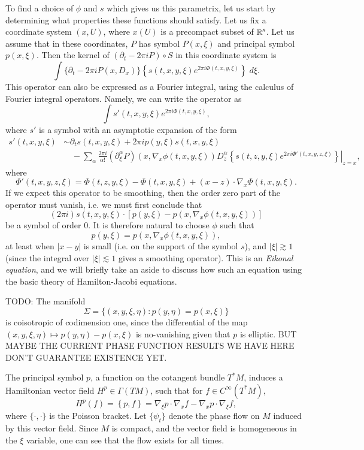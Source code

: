 To find a choice of $\phi$ and $s$ which gives us this parametrix, let us start by determining what properties these functions should satisfy. Let us fix a coordinate system $(x,U)$, where $x(U)$ is a precompact subset of $\operatorname{\mathbb{R}}^n$. Let us assume that in these coordinates, $P$ has symbol $P(x,\xi)$ and principal symbol $p(x,\xi)$. Then the kernel of $(\partial_t - 2 \pi i P) \circ S$ in this coordinate system is
%
\[ \int \{ \partial_t - 2 \pi i P(x,D_x) \} \left\{ s(t,x,y,\xi) e^{2 \pi i \Phi(t,x,y,\xi)} \right\}\; d\xi. \]
%
This operator can also be expressed as a Fourier integral, using the calculus of Fourier integral operators. Namely, we can write the operator as
%
\[ \int s'(t,x,y,\xi) e^{2 \pi i \Phi(t,x,y,\xi)}, \]
%
where $s'$ is a symbol with an asymptotic expansion of the form
%
\begin{align*}
    s'(t,x,y,\xi) &\sim \partial_t s(t,x,y,\xi) + 2 \pi i p(y,\xi) s(t,x,y,\xi)\\
    &\quad - \sum_\alpha \frac{2 \pi i}{\alpha!} (\partial_\xi^\alpha P)(x, \nabla_x \phi(t,x,y,\xi)) \left. D^\alpha_z \left\{ s(t,z,y,\xi) e^{2 \pi i \Phi'(t,x,y,z,\xi)} \right\} \right|_{z = x},
\end{align*}
%
where
%
\[ \Phi'(t,x,y,z,\xi) = \Phi(t,z,y,\xi) - \Phi(t,x,y,\xi) + (x - z) \cdot \nabla_x \Phi(t,x,y,\xi). \]
%
If we expect this operator to be smoothing, then the order zero part of the operator must vanish, i.e. we must first conclude that
%
\[ (2 \pi i) s(t,x,y,\xi) \cdot [p(y,\xi) - p(x, \nabla_x \phi(t,x,y,\xi))] \]
%
be a symbol of order $0$. It is therefore natural to choose $\phi$ such that
%
\[ p(y,\xi) = p(x,\nabla_x \phi(t,x,y,\xi)), \]
%
at least when $|x - y|$ is small (i.e. on the support of the symbol $s$), and $|\xi| \gtrsim 1$ (since the integral over $|\xi| \lesssim 1$ gives a smoothing operator). This is an \emph{Eikonal equation}, and we will briefly take an aside to discuss how such an equation using the basic theory of Hamilton-Jacobi equations. 

TODO: The manifold
%
\[ \Sigma = \{ (x,y,\xi,\eta): p(y,\eta) = p(x,\xi) \} \]
%
is coisotropic of codimension one, since the differential of the map $(x,y,\xi,\eta) \mapsto p(y,\eta) - p(x,\xi)$ is no-vanishing given that $p$ is elliptic. BUT MAYBE THE CURRENT PHASE FUNCTION RESULTS WE HAVE HERE DON'T GUARANTEE EXISTENCE YET.

The principal symbol $p$, a function on the cotangent bundle $T^* M$, induces a Hamiltonian vector field $H^p \in \Gamma(TM)$, such that for $f \in C^\infty(T^* M)$,
%
\[ H^p(f) = \left\{ p, f \right\} = \nabla_\xi p \cdot \nabla_x f - \nabla_x p \cdot \nabla_\xi f, \]
%
where $\{ \cdot, \cdot \}$ is the Poisson bracket. Let $\{ \psi_t \}$ denote the phase flow on $M$ induced by this vector field. Since $M$ is compact, and the vector field is homogeneous in the $\xi$ variable, one can see that the flow exists for all times.

